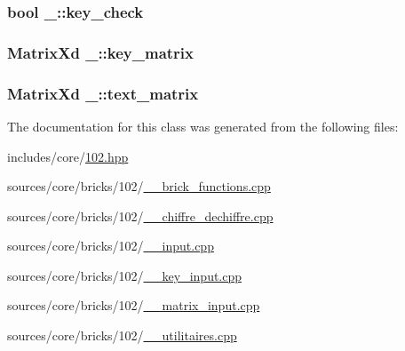 \subsubsection[{key\+\_\+check}]{\setlength{\rightskip}{0pt plus 5cm}bool \+\_\+::key\+\_\+check\hspace{0.3cm}{\ttfamily [private]}}\label{class__102_aedece1a24c9d0ba12efa5e9429eb2de0}
\hypertarget{class__102_a6284519dfd2d04e52a37e265488d05cc}{}
\subsubsection[{key\+\_\+matrix}]{\setlength{\rightskip}{0pt plus 5cm}Matrix\+Xd \+\_\+::key\+\_\+matrix\hspace{0.3cm}{\ttfamily [private]}}\label{class__102_a6284519dfd2d04e52a37e265488d05cc}
\hypertarget{class__102_a2836a7b0f462c1f3ff8b6df7e41420f2}{}
\subsubsection[{text\+\_\+matrix}]{\setlength{\rightskip}{0pt plus 5cm}Matrix\+Xd \+\_\+::text\+\_\+matrix\hspace{0.3cm}{\ttfamily [private]}}\label{class__102_a2836a7b0f462c1f3ff8b6df7e41420f2}


The documentation for this class was generated from the following files\+:\begin{DoxyCompactItemize}
\item 
includes/core/\hyperlink{102_8hpp}{102.\+hpp}\item 
sources/core/bricks/102/\hyperlink{__102__brick__functions_8cpp}{\+\_\+\_\+brick\+\_\+functions.\+cpp}\item 
sources/core/bricks/102/\hyperlink{__102__chiffre__dechiffre_8cpp}{\+\_\+\_\+chiffre\+\_\+dechiffre.\+cpp}\item 
sources/core/bricks/102/\hyperlink{__102__input_8cpp}{\+\_\+\_\+input.\+cpp}\item 
sources/core/bricks/102/\hyperlink{__102__key__input_8cpp}{\+\_\+\_\+key\+\_\+input.\+cpp}\item 
sources/core/bricks/102/\hyperlink{__102__matrix__input_8cpp}{\+\_\+\_\+matrix\+\_\+input.\+cpp}\item 
sources/core/bricks/102/\hyperlink{__102__utilitaires_8cpp}{\+\_\+\_\+utilitaires.\+cpp}\end{DoxyCompactItemize}
